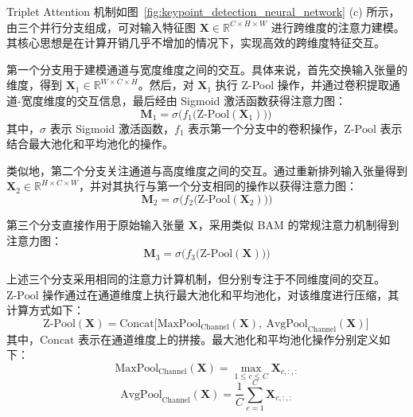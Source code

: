 Triplet Attention 机制如图~\ref{fig:keypoint_detection_neural_network} (c) 所示，由三个并行分支组成，可对输入特征图 $\mathbf{X} \in \mathbb{R}^{C \times H \times W}$ 进行跨维度的注意力建模。其核心思想是在计算开销几乎不增加的情况下，实现高效的跨维度特征交互。

第一个分支用于建模通道与宽度维度之间的交互。具体来说，首先交换输入张量的维度，得到 $\mathbf{X}_{1} \in \mathbb{R}^{W \times C \times H}$。然后，对 $\mathbf{X}_{1}$ 执行 Z-Pool 操作，并通过卷积提取通道-宽度维度的交互信息，最后经由 Sigmoid 激活函数获得注意力图：
\begin{equation} 
	\mathbf{M}_{1} = \sigma\!\Big(f_{1}\big(\text{Z-Pool}(\mathbf{X}_{1})\big)\Big)\,
\end{equation}
其中，$\sigma$ 表示 Sigmoid 激活函数，$f_{1}$ 表示第一个分支中的卷积操作，$\text{Z-Pool}$ 表示结合最大池化和平均池化的操作。

类似地，第二个分支关注通道与高度维度之间的交互。通过重新排列输入张量得到 $\mathbf{X}_{2} \in \mathbb{R}^{H \times C \times W}$，并对其执行与第一个分支相同的操作以获得注意力图：
\begin{equation} 
	\mathbf{M}_{2} = \sigma\!\Big(f_{2}\big(\text{Z-Pool}(\mathbf{X}_{2})\big)\Big)
\end{equation}

第三个分支直接作用于原始输入张量 $\mathbf{X}$，采用类似 BAM 的常规注意力机制得到注意力图：
\begin{equation} 
	\mathbf{M}_{3} = \sigma\!\Big(f_{3}\big(\text{Z-Pool}(\mathbf{X})\big)\Big)
\end{equation}

上述三个分支采用相同的注意力计算机制，但分别专注于不同维度间的交互。$\text{Z-Pool}$ 操作通过在通道维度上执行最大池化和平均池化，对该维度进行压缩，其计算方式如下：
\begin{equation} 
	\text{Z-Pool}(\mathbf{X}) = \text{Concat}\Big[\text{MaxPool}_{\text{Channel}}(\mathbf{X}),\ \text{AvgPool}_{\text{Channel}}(\mathbf{X})\Big]\,
\end{equation}
其中，$\text{Concat}$ 表示在通道维度上的拼接。最大池化和平均池化操作分别定义如下：
\begin{equation} 
	\text{MaxPool}_{\text{Channel}}(\mathbf{X}) = \max_{1 \le c \le C} \mathbf{X}_{c,:,:}
\end{equation}
\begin{equation} 
	\text{AvgPool}_{\text{Channel}}(\mathbf{X}) = \frac{1}{C} \sum_{c=1}^{C} \mathbf{X}_{c,:,:}
\end{equation}

